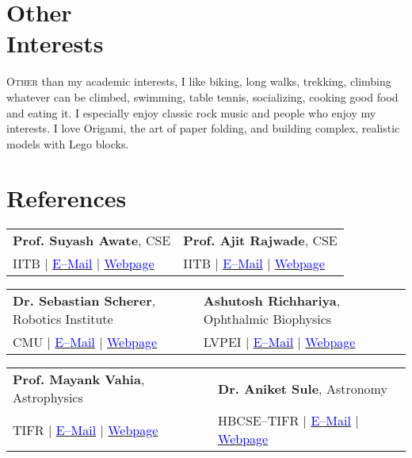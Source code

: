\documentclass[margin,line]{res}
\begin{document}
\begin{resume}
\section{\sc Other \\Interests}
\lettrine[lines=2]{O}{ther} than my academic interests, I like biking, long walks, trekking, climbing whatever can be climbed, swimming, table tennis, socializing, cooking good food and eating it. I especially enjoy classic rock music and people who enjoy my interests. I love Origami, the art of paper folding, and building complex, realistic models with Lego blocks.

\section{\sc References}
\begin{tabular}{@{}p{3in}p{3in}}
\textbf{Prof. Suyash Awate}, CSE & \textbf{Prof. Ajit Rajwade}, CSE \\ 
IITB $|$ \href{mailto:suyash@cse.iitb.ac.in}{\textcolor{blue}{E--Mail}} $|$ \href{https://www.cse.iitb.ac.in/~suyash}{\textcolor{blue}{Webpage}} & IITB $|$ \href{mailto:ajitvr@cse.iitb.ac.in}{\textcolor{blue}{E--Mail}} $|$ \href{https://www.cse.iitb.ac.in/~ajitvr}{\textcolor{blue}{Webpage}} \\
\end{tabular}
\vspace{-0.15in}

\begin{tabular}{@{}p{3in}p{3in}}
\textbf{Dr. Sebastian Scherer}, Robotics Institute & \textbf{Ashutosh Richhariya}, Ophthalmic Biophysics \\ 
CMU $|$ \href{mailto:basti@andrew.cmu.edu}{\textcolor{blue}{E--Mail}} $|$ \href{http://www.ri.cmu.edu/person.html?person_id=1397}{\textcolor{blue}{Webpage}} & LVPEI $|$ \href{mailto:ashutosh@lvpei.org}{\textcolor{blue}{E--Mail}} $|$ \href{http://www.lvpei.org/our-team/our-team-ashutosh.php}{\textcolor{blue}{Webpage}} \\
\end{tabular}
\vspace{-0.15in}

\begin{tabular}{@{}p{3in}p{3in}}
\textbf{Prof. Mayank Vahia}, Astrophysics & \textbf{Dr. Aniket Sule}, Astronomy \\
TIFR $|$ \href{mailto:vahia@tifr.res.in}{\textcolor{blue}{E--Mail}} $|$ \href{http://www.tifr.res.in/~vahia/}{\textcolor{blue}{Webpage}} & HBCSE--TIFR $|$ \href{mailto:anikets@hbcse.tifr.res.in}{\textcolor{blue}{E--Mail}} $|$ \href{http://www.hbcse.tifr.res.in/people/academic/aniket-sule}{\textcolor{blue}{Webpage}} \\
\end{tabular}
\vspace{-0.15in}


\end{resume}
\end{document}
